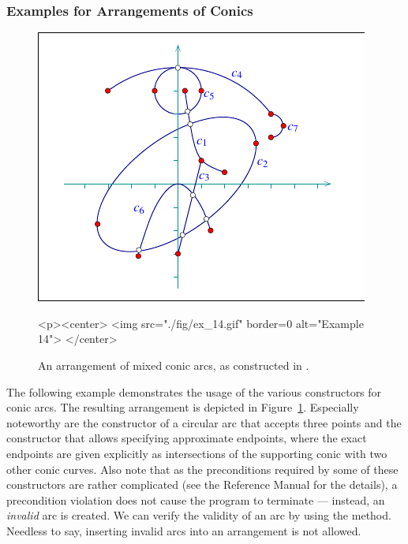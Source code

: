\subsubsection{Examples for Arrangements of Conics}

\begin{figure}[t]
\begin{ccTexOnly}
  \begin{center}
  \includegraphics{Arrangement_2/fig/ex_14}
  \end{center}
\end{ccTexOnly}
\begin{ccHtmlOnly}
  <p><center>
  <img src="./fig/ex_14.gif" border=0 alt="Example 14">
  </center>
\end{ccHtmlOnly}
\caption{An arrangement of mixed conic arcs, as constructed in
.}
\label{arr_fig:ex_14}
\end{figure}

The following example demonstrates the usage of the various
constructors for conic arcs. The resulting arrangement is depicted
in Figure~\ref{arr_fig:ex_14}. Especially noteworthy are the
constructor of a circular arc that accepts three points and the
constructor that allows specifying approximate endpoints, where the
exact endpoints are given explicitly as intersections of
the supporting conic with two other conic curves. Also note that as the
preconditions required by some of these constructors are rather
complicated (see the Reference Manual for the details), a
precondition violation does not cause the program to terminate ---
instead, an {\em invalid} arc is created. We can verify the validity
of an arc by using the  method. Needless to say, inserting
invalid arcs into an arrangement is not allowed.

